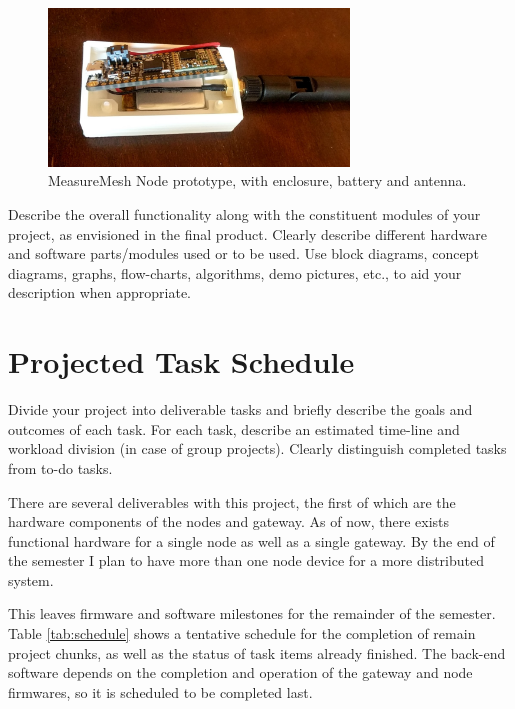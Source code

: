\documentclass{IEEEtran}
\begin{document}
\begin{figure}
    \centering
    \includegraphics[width=8cm]{images/nodePrototype}
    \caption{MeasureMesh Node prototype, with enclosure, battery and antenna.}
    \label{fig:nodeproto}
\end{figure}

Describe the overall functionality along with the constituent modules of your project, as envisioned in the final product. Clearly describe different hardware and software parts/modules used or to be used. Use block diagrams, concept diagrams, graphs, flow-charts, algorithms, demo pictures, etc., to aid your description when appropriate.

\section{Projected Task Schedule} 
Divide your project into deliverable tasks and briefly describe the goals and outcomes of each task. For each task, describe an estimated time-line and workload division (in case of group projects). Clearly distinguish completed tasks from to-do tasks.

There are several deliverables with this project, the first of which are the hardware components of the nodes and gateway. As of now, there exists functional hardware for a single node as well as a single gateway. By the end of the semester I plan to have more than one node device for a more distributed system.

This leaves firmware and software milestones for the remainder of the semester. Table \ref{tab:schedule} shows a tentative schedule for the completion of remain project chunks, as well as the status of task items already finished. The back-end software depends on the completion and operation of the gateway and node firmwares, so it is scheduled to be completed last.
\end{document}
